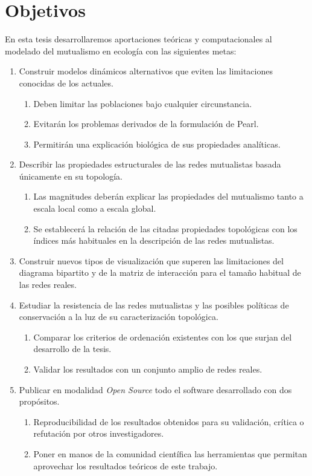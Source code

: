 \clearpage
\section{Objetivos}

En esta tesis desarrollaremos aportaciones teóricas y computacionales al modelado del mutualismo en ecología con las siguientes metas:

\begin{enumerate}
\item Construir modelos dinámicos alternativos que eviten las limitaciones conocidas de los actuales.
   \begin{enumerate}
		\item Deben limitar las poblaciones bajo cualquier circunstancia.
		\item Evitarán los problemas derivados de la formulación de Pearl.
		\item Permitirán una explicación biológica de sus propiedades analíticas.
   \end{enumerate}
   
\item Describir las propiedades estructurales de las redes mutualistas basada únicamente en su topología.
		\begin{enumerate}
		\item Las magnitudes deberán explicar las propiedades del mutualismo tanto a escala local como a escala global.
		\item Se establecerá la relación de las citadas propiedades topológicas con los índices más habituales en la descripción de las redes mutualistas.
		\end{enumerate}
		
\item Construir nuevos tipos de visualización que superen las limitaciones del diagrama bipartito y de la matriz de interacción para el tamaño habitual de las redes reales.

\item Estudiar la resistencia de las redes mutualistas y las posibles políticas de conservación a la luz de su caracterización topológica.
\begin{enumerate}
		\item Comparar los criterios de ordenación existentes con los que surjan del desarrollo de la tesis.
		\item Validar los resultados con un conjunto amplio de redes reales.
		\end{enumerate}
		
\item Publicar en modalidad \textit{Open Source} todo el software desarrollado con dos propósitos.
 \begin{enumerate}
		\item Reproducibilidad de los resultados obtenidos para su validación, crítica o refutación por otros investigadores.
		\item Poner en manos de la comunidad científica las herramientas que permitan aprovechar los resultados teóricos de este trabajo.
		\end{enumerate}
\end{enumerate}



